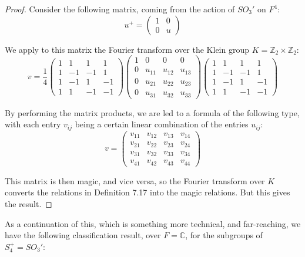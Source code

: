 \documentclass[12pt]{amsbook}
\begin{document}
\begin{proof}
Consider the following matrix, coming from the action of $SO_3'$ on $F^4$:
$$u^+=\begin{pmatrix}1&0\\0&u\end{pmatrix}$$

We apply to this matrix the Fourier transform over the Klein group $K=\mathbb Z_2\times\mathbb Z_2$: 
$$v=
\frac{1}{4}
\begin{pmatrix}
1&1&1&1\\
1&-1&-1&1\\
1&-1&1&-1\\
1&1&-1&-1
\end{pmatrix}
\begin{pmatrix}
1&0&0&0\\
0&u_{11}&u_{12}&u_{13}\\
0&u_{21}&u_{22}&u_{23}\\
0&u_{31}&u_{32}&u_{33}
\end{pmatrix}
\begin{pmatrix}
1&1&1&1\\
1&-1&-1&1\\
1&-1&1&-1\\
1&1&-1&-1
\end{pmatrix}$$

By performing the matrix products, we are led to a formula of the following type, with each entry $v_{ij}$ being a certain linear combination of the entries $u_{ij}$:
$$v=\begin{pmatrix}
v_{11}&v_{12}&v_{13}&v_{14}\\
v_{21}&v_{22}&v_{23}&v_{24}\\
v_{31}&v_{32}&v_{33}&v_{34}\\
v_{41}&v_{42}&v_{43}&v_{44}
\end{pmatrix}$$

This matrix is then magic, and vice versa, so the Fourier transform over $K$ converts the relations in Definition 7.17 into the magic relations. But this gives the result.
\end{proof}

As a continuation of this, which is something more technical, and far-reaching, we have the following classification result, over $F=\mathbb C$, for the subgroups of $S_4^+=SO_3'$:

\end{document}
